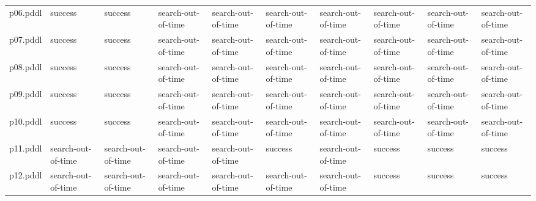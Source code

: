 \documentclass{article}
\begin{document}
\begin{tabular}{@{}lrrrrrrrrr@{}}
p06.pddl & \multicolumn{1}{|l|}{success} & \multicolumn{1}{|l|}{success} & \multicolumn{1}{|l|}{search-out-of-time} & \multicolumn{1}{|l|}{search-out-of-time} & \multicolumn{1}{|l|}{search-out-of-time} & \multicolumn{1}{|l|}{search-out-of-time} & \multicolumn{1}{|l|}{search-out-of-time} & \multicolumn{1}{|l|}{search-out-of-time} & \multicolumn{1}{|l|}{search-out-of-time} \\
p07.pddl & \multicolumn{1}{|l|}{success} & \multicolumn{1}{|l|}{success} & \multicolumn{1}{|l|}{search-out-of-time} & \multicolumn{1}{|l|}{search-out-of-time} & \multicolumn{1}{|l|}{search-out-of-time} & \multicolumn{1}{|l|}{search-out-of-time} & \multicolumn{1}{|l|}{search-out-of-time} & \multicolumn{1}{|l|}{search-out-of-time} & \multicolumn{1}{|l|}{search-out-of-time} \\
p08.pddl & \multicolumn{1}{|l|}{success} & \multicolumn{1}{|l|}{success} & \multicolumn{1}{|l|}{search-out-of-time} & \multicolumn{1}{|l|}{search-out-of-time} & \multicolumn{1}{|l|}{search-out-of-time} & \multicolumn{1}{|l|}{search-out-of-time} & \multicolumn{1}{|l|}{search-out-of-time} & \multicolumn{1}{|l|}{search-out-of-time} & \multicolumn{1}{|l|}{search-out-of-time} \\
p09.pddl & \multicolumn{1}{|l|}{success} & \multicolumn{1}{|l|}{success} & \multicolumn{1}{|l|}{search-out-of-time} & \multicolumn{1}{|l|}{search-out-of-time} & \multicolumn{1}{|l|}{search-out-of-time} & \multicolumn{1}{|l|}{search-out-of-time} & \multicolumn{1}{|l|}{search-out-of-time} & \multicolumn{1}{|l|}{search-out-of-time} & \multicolumn{1}{|l|}{search-out-of-time} \\
p10.pddl & \multicolumn{1}{|l|}{success} & \multicolumn{1}{|l|}{success} & \multicolumn{1}{|l|}{search-out-of-time} & \multicolumn{1}{|l|}{search-out-of-time} & \multicolumn{1}{|l|}{search-out-of-time} & \multicolumn{1}{|l|}{search-out-of-time} & \multicolumn{1}{|l|}{search-out-of-time} & \multicolumn{1}{|l|}{search-out-of-time} & \multicolumn{1}{|l|}{search-out-of-time} \\
p11.pddl & \multicolumn{1}{|l|}{search-out-of-time} & \multicolumn{1}{|l|}{search-out-of-time} & \multicolumn{1}{|l|}{search-out-of-time} & \multicolumn{1}{|l|}{search-out-of-time} & \multicolumn{1}{|l|}{success} & \multicolumn{1}{|l|}{search-out-of-time} & \multicolumn{1}{|l|}{success} & \multicolumn{1}{|l|}{success} & \multicolumn{1}{|l|}{success} \\
p12.pddl & \multicolumn{1}{|l|}{search-out-of-time} & \multicolumn{1}{|l|}{search-out-of-time} & \multicolumn{1}{|l|}{search-out-of-time} & \multicolumn{1}{|l|}{search-out-of-time} & \multicolumn{1}{|l|}{search-out-of-time} & \multicolumn{1}{|l|}{search-out-of-time} & \multicolumn{1}{|l|}{success} & \multicolumn{1}{|l|}{success} & \multicolumn{1}{|l|}{success} \\

\end{tabular}
\end{document}
